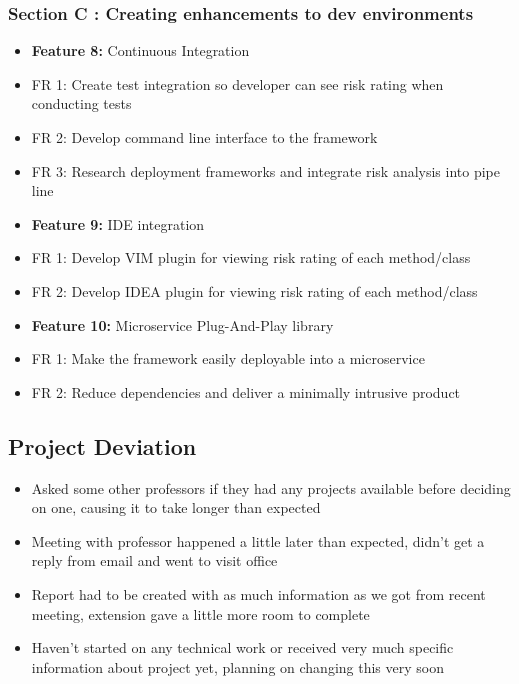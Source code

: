 \documentclass[11pt,]{article}
\providecommand{\tightlist}{%
  \setlength{\itemsep}{0pt}\setlength{\parskip}{0pt}}
\begin{document}
\subsubsection{Section C : Creating enhancements to dev
environments}\label{section-c-creating-enhancements-to-dev-environments}

\begin{itemize}
\item
  \textbf{Feature 8:} Continuous Integration
\item
  FR 1: Create test integration so developer can see risk rating when
  conducting tests
\item
  FR 2: Develop command line interface to the framework
\item
  FR 3: Research deployment frameworks and integrate risk analysis into
  pipe line
\item
  \textbf{Feature 9:} IDE integration
\item
  FR 1: Develop VIM plugin for viewing risk rating of each method/class
\item
  FR 2: Develop IDEA plugin for viewing risk rating of each method/class
\item
  \textbf{Feature 10:} Microservice Plug-And-Play library
\item
  FR 1: Make the framework easily deployable into a microservice
\item
  FR 2: Reduce dependencies and deliver a minimally intrusive product
\end{itemize}

\subsection{Project Deviation}\label{project-deviation}

\begin{itemize}
\tightlist
\item
  Asked some other professors if they had any projects available before
  deciding on one, causing it to take longer than expected
\item
  Meeting with professor happened a little later than expected, didn't
  get a reply from email and went to visit office
\item
  Report had to be created with as much information as we got from
  recent meeting, extension gave a little more room to complete
\item
  Haven't started on any technical work or received very much specific
  information about project yet, planning on changing this very soon
\end{itemize}
\end{document}
